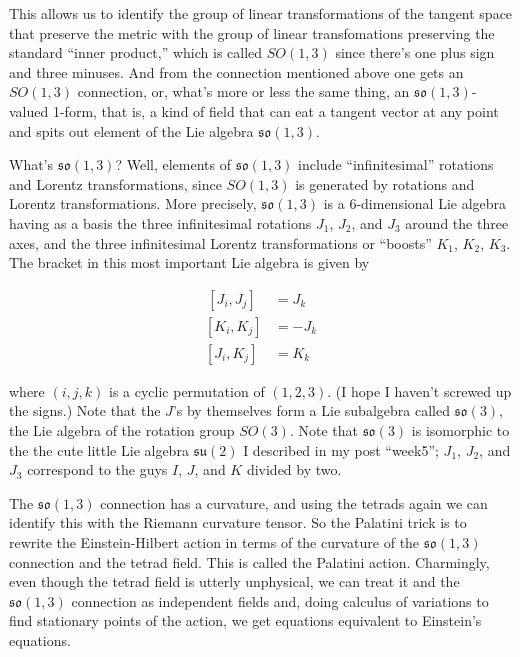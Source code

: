 \documentclass{article}
\begin{document}
This allows us to identify the group of linear transformations of the
tangent space that preserve the metric with the group of linear
transfomations preserving the standard ``inner product,'' which is
called \(SO(1,3)\) since there's one plus sign and three minuses. And
from the connection mentioned above one gets an \(SO(1,3)\) connection,
or, what's more or less the same thing, an \(\mathfrak{so}(1,3)\)-valued
1-form, that is, a kind of field that can eat a tangent vector at any
point and spits out element of the Lie algebra \(\mathfrak{so}(1,3)\).

What's \(\mathfrak{so}(1,3)\)? Well, elements of \(\mathfrak{so}(1,3)\)
include ``infinitesimal'' rotations and Lorentz transformations, since
\(SO(1,3)\) is generated by rotations and Lorentz transformations. More
precisely, \(\mathfrak{so}(1,3)\) is a 6-dimensional Lie algebra having
as a basis the three infinitesimal rotations \(J_1\), \(J_2\), and
\(J_3\) around the three axes, and the three infinitesimal Lorentz
transformations or ``boosts'' \(K_1\), \(K_2\), \(K_3\). The bracket in
this most important Lie algebra is given by

\[\begin{aligned}\,[J_i,J_j] & = J_k \\ [K_i,K_j] &= -J_k \\ [J_i,K_j] &= K_k\end{aligned}\]

where \((i,j,k)\) is a cyclic permutation of \((1,2,3)\). (I hope I
haven't screwed up the signs.) Note that the \(J\)'s by themselves form
a Lie subalgebra called \(\mathfrak{so}(3)\), the Lie algebra of the
rotation group \(SO(3)\). Note that \(\mathfrak{so}(3)\) is isomorphic
to the the cute little Lie algebra \(\mathfrak{su}(2)\) I described in
my post ``week5''; \(J_1\), \(J_2\), and \(J_3\) correspond to the guys
\(I\), \(J\), and \(K\) divided by two.

The \(\mathfrak{so}(1,3)\) connection has a curvature, and using the
tetrads again we can identify this with the Riemann curvature tensor. So
the Palatini trick is to rewrite the Einstein-Hilbert action in terms of
the curvature of the \(\mathfrak{so}(1,3)\) connection and the tetrad
field. This is called the Palatini action. Charmingly, even though the
tetrad field is utterly unphysical, we can treat it and the
\(\mathfrak{so}(1,3)\) connection as independent fields and, doing
calculus of variations to find stationary points of the action, we get
equations equivalent to Einstein's equations.
\end{document}
